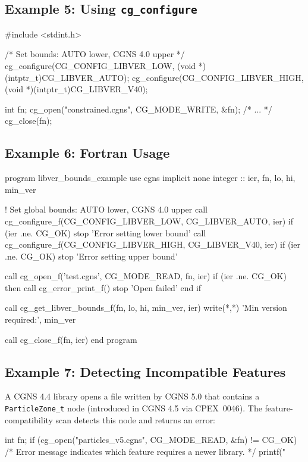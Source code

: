 \documentclass[11pt,letterpaper]{article}
\makeatletter
\let\cgns@orig@lstlisting\lstlisting
\let\cgns@endorig@lstlisting\endlstlisting
\renewenvironment{lstlisting}
  {\par\needspace{5\baselineskip}\nolinenumbers\cgns@orig@lstlisting}
  {\cgns@endorig@lstlisting\par\linenumbers}
\makeatother
\begin{document}
\subsection{Example 5: Using \texttt{cg\_configure}}

\begin{lstlisting}[language=C]
#include <stdint.h>

/* Set bounds: AUTO lower, CGNS 4.0 upper */
cg_configure(CG_CONFIG_LIBVER_LOW,
             (void *)(intptr_t)CG_LIBVER_AUTO);
cg_configure(CG_CONFIG_LIBVER_HIGH,
             (void *)(intptr_t)CG_LIBVER_V40);

int fn;
cg_open("constrained.cgns", CG_MODE_WRITE, &fn);
/* ... */
cg_close(fn);
\end{lstlisting}

\subsection{Example 6: Fortran Usage}

\begin{lstlisting}[language=Fortran]
program libver_bounds_example
  use cgns
  implicit none
  integer :: ier, fn, lo, hi, min_ver

  ! Set global bounds: AUTO lower, CGNS 4.0 upper
  call cg_configure_f(CG_CONFIG_LIBVER_LOW,  CG_LIBVER_AUTO, ier)
  if (ier .ne. CG_OK) stop 'Error setting lower bound'
  call cg_configure_f(CG_CONFIG_LIBVER_HIGH, CG_LIBVER_V40,  ier)
  if (ier .ne. CG_OK) stop 'Error setting upper bound'

  call cg_open_f('test.cgns', CG_MODE_READ, fn, ier)
  if (ier .ne. CG_OK) then
     call cg_error_print_f()
     stop 'Open failed'
  end if

  call cg_get_libver_bounds_f(fn, lo, hi, min_ver, ier)
  write(*,*) 'Min version required:', min_ver

  call cg_close_f(fn, ier)
end program
\end{lstlisting}

\subsection{Example 7: Detecting Incompatible Features}

A CGNS 4.4 library opens a file written by CGNS 5.0 that contains
a \texttt{ParticleZone\_t} node (introduced in CGNS 4.5 via
CPEX~0046).  The feature-compatibility scan detects this node and
returns an error:

\begin{lstlisting}[language=C]
int fn;
if (cg_open("particles_v5.cgns", CG_MODE_READ, &fn)
        != CG_OK) {
    /* Error message indicates which feature requires
       a newer library. */
    printf("%s\n", cg_get_error());
}
\end{lstlisting}
\end{document}
